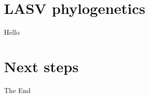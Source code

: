 \documentclass{beamer}
\begin{document}
\section{LASV phylogenetics}

\begin{frame}
  Hello
\end{frame}

\section{Next steps}

\begin{frame}
\Huge{\centerline{The End}}
\end{frame}

\end{document}
